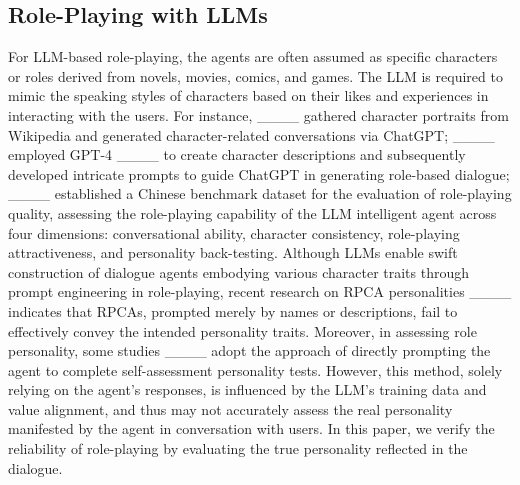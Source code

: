\subsection{Role-Playing with LLMs}
For LLM-based role-playing, the agents are often assumed as specific characters or roles derived from novels, movies, comics, and games. The LLM is required to mimic the speaking styles of characters based on their likes and experiences in interacting with the users. For instance, ____ gathered character portraits from Wikipedia and generated character-related conversations via ChatGPT; ____ employed GPT-4 ____ to create character descriptions and subsequently developed intricate prompts to guide ChatGPT in generating role-based dialogue; ____ established a Chinese benchmark dataset for the evaluation of role-playing quality, assessing the role-playing capability of the LLM intelligent agent across four dimensions: conversational ability, character consistency, role-playing attractiveness, and personality back-testing. Although LLMs enable swift construction of dialogue agents embodying various character traits through prompt engineering in role-playing, recent research on RPCA personalities ____ indicates that RPCAs, prompted merely by names or descriptions, fail to effectively convey the intended personality traits. Moreover, in assessing role personality, some studies ____ adopt the approach of directly prompting the agent to complete self-assessment personality tests. However, this method, solely relying on the agent's responses, is influenced by the LLM's training data and value alignment, and thus may not accurately assess the real personality manifested by the agent in conversation with users. In this paper, we verify the reliability of role-playing by evaluating the true personality reflected in the dialogue.